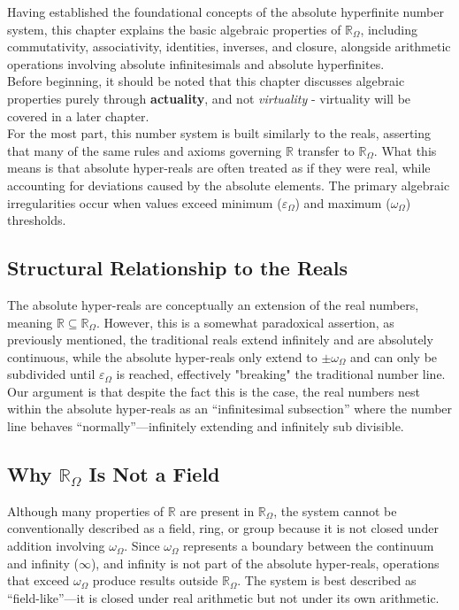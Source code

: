 \documentclass{article}
\begin{document}
Having established the foundational concepts of the absolute hyperfinite number system, this chapter explains the basic algebraic properties of $\mathbb{R}_\Omega$, including commutativity, associativity, identities, inverses, and closure, alongside arithmetic operations involving absolute infinitesimals and absolute hyperfinites.\\Before beginning, it should be noted that this chapter discusses algebraic properties purely through \textbf{actuality}, and not \textit{virtuality} - virtuality will be covered in a later chapter. \\For the most part, this number system is built similarly to the reals, asserting that many of the same rules and axioms governing $\mathbb{R}$ transfer to $\mathbb{R}_\Omega$. What this means is that absolute hyper-reals are often treated as if they were real, while accounting for deviations caused by the absolute elements. The primary algebraic irregularities occur when values exceed minimum ($\varepsilon_\Omega$) and maximum ($\omega_\Omega$) thresholds.

\subsection{Structural Relationship to the Reals}

The absolute hyper-reals are conceptually an extension of the real numbers, meaning $\mathbb{R} \subseteq \mathbb{R}_\Omega$. However, this is a somewhat paradoxical assertion, as previously mentioned, the traditional reals extend infinitely and are absolutely continuous, while the absolute hyper-reals only extend to $\pm\omega_\Omega$ and can only be subdivided until $\varepsilon_\Omega$ is reached, effectively "breaking" the traditional number line. Our argument is that despite the fact this is the case, the real numbers nest within the absolute hyper-reals as an ``infinitesimal subsection'' where the number line behaves ``normally''---infinitely extending and infinitely sub divisible.

\subsection{Why $\mathbb{R}_\Omega$ Is Not a Field}

Although many properties of $\mathbb{R}$ are present in $\mathbb{R}_\Omega$, the system cannot be conventionally described as a field, ring, or group because it is not closed under addition involving $\omega_\Omega$. Since $\omega_\Omega$ represents a boundary between the continuum and infinity ($\infty$), and infinity is not part of the absolute hyper-reals, operations that exceed $\omega_\Omega$ produce results outside $\mathbb{R}_\Omega$. The system is best described as ``field-like''---it is closed under real arithmetic but not under its own arithmetic.
\end{document}
